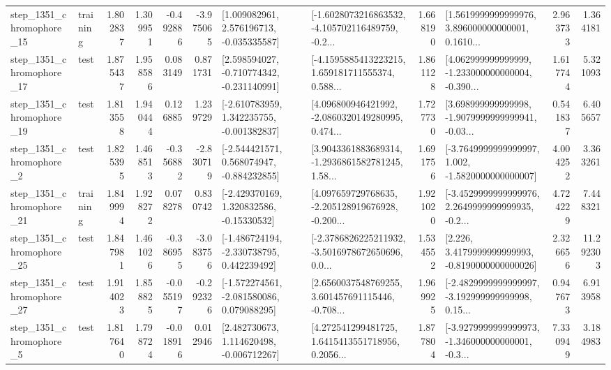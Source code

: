 \begin{tabular}{llrrrrllrlrr}
 step\_1351\_chromophore\_15 &  training &      1.802837 &    1.309951 &     -0.492886 & -3.975065 &    [1.009082961, 2.576196713, -0.035335587] &  [-1.6028073216863532, -4.105702116489759, -0.2... &       1.668190 &  [1.5619999999999976, 3.896000000000001, 0.1610... &            2.963733 &          1.364181 \\
 step\_1351\_chromophore\_17 &      test &      1.875437 &    1.958586 &      0.083149 &  0.871731 &   [2.598594027, -0.710774342, -0.231140991] &  [-4.1595885413223215, 1.659181711555374, 0.588... &       1.861128 &  [4.062999999999999, -1.233000000000004, -0.390... &            1.617744 &          5.321093 \\
 step\_1351\_chromophore\_19 &      test &      1.813558 &    1.940444 &      0.126885 &  1.239729 &   [-2.610783959, 1.342235755, -0.001382837] &  [4.096800946421992, -2.0860320149280995, 0.474... &       1.727730 &  [3.698999999999998, -1.9079999999999941, -0.03... &            0.541837 &          6.405657 \\
  step\_1351\_chromophore\_2 &      test &      1.825395 &    1.468513 &     -0.356882 & -2.830719 &   [-2.544421571, 0.568074947, -0.884232855] &  [3.9043361883689314, -1.2936861582781245, 1.58... &       1.691756 &  [-3.7649999999999997, 1.002, -1.5820000000000007] &            4.004252 &          3.363261 \\
 step\_1351\_chromophore\_21 &  training &      1.849994 &    1.928272 &      0.078278 &  0.830742 &    [-2.429370169, 1.320832586, -0.15330532] &  [4.097659729768635, -2.205128919676928, -0.200... &       1.921020 &  [-3.4529999999999976, 2.2649999999999935, -0.2... &            4.724229 &          7.448321 \\
 step\_1351\_chromophore\_25 &      test &      1.847981 &    1.461026 &     -0.386955 & -3.083756 &   [-1.486724194, -2.330738795, 0.442239492] &  [-2.3786826225211932, -3.5016978672650696, 0.0... &       1.534552 &   [2.226, 3.4179999999999993, -0.8190000000000026] &            2.326656 &         11.292303 \\
 step\_1351\_chromophore\_27 &      test &      1.914023 &    1.858825 &     -0.055197 & -0.292326 &   [-1.572274561, -2.081580086, 0.079088295] &  [2.6560037548769255, 3.601457691115446, -0.708... &       1.969925 &  [-2.4829999999999997, -3.192999999999998, 0.15... &            0.947673 &          6.913958 \\
  step\_1351\_chromophore\_5 &      test &      1.817640 &    1.798724 &     -0.018916 &  0.012946 &    [2.482730673, 1.114620498, -0.006712267] &  [4.272541299481725, 1.6415413551718956, 0.2056... &       1.877804 &  [-3.9279999999999973, -1.346000000000001, -0.3... &            7.330949 &          3.184983 \\

\end{tabular}
